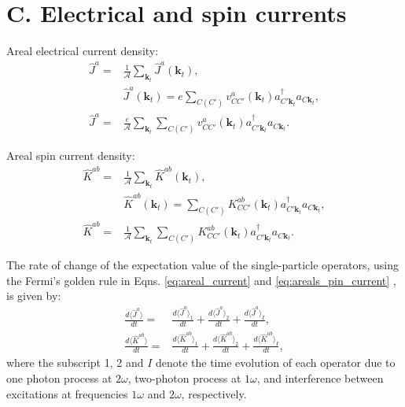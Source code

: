 \documentclass{article}
\begin{document}

\section{C. Electrical and spin currents} %
\label{sec:electrical_and_spin_currents}

Areal electrical current density:
\begin{align}\label{eq:areal_current}
    \hat{J}^{a} = & \frac{1}{\mathcal{A}} \sum_{\mathbf{k}_{t}} \hat{J}^{a}(\mathbf{k}_{t}), \nonumber \\
    & \hat{J}^{a}(\mathbf{k}_{t}) = e \sum_{C(C')}v^{a}_{CC'}(\mathbf{k}_{t})
    a^{\dag}_{C'\mathbf{k}_{t}} a_{C\mathbf{k}_{t}}, \nonumber \\
    \hat{J}^{a} = & \frac{e}{\mathcal{A}} \sum_{\mathbf{k}_{t}} \sum_{C(C')}v^{a}_{CC'}(\mathbf{k}_{t})
    a^{\dag}_{C'\mathbf{k}_{t}} a_{C\mathbf{k}_{t}}.
\end{align}

Areal spin current density:
\begin{align}\label{eq:areals_pin_current}
    \hat{K}^{ab} = & \frac{1}{\mathcal{A}} \sum_{\mathbf{k}_{t}} \hat{K}^{ab}(\mathbf{k}_{t}), \nonumber \\
    & \hat{K}^{ab}(\mathbf{k}_{t}) =   \sum_{C(C')}K^{ab}_{CC'}(\mathbf{k}_{t})
    a^{\dag}_{C'\mathbf{k}_{t}} a_{C\mathbf{k}_{t}}, \nonumber \\
    \hat{K}^{ab} = & \frac{1}{\mathcal{A}} \sum_{\mathbf{k}_{t}} \sum_{C(C')}K^{ab}_{CC'}(\mathbf{k}_{t})
    a^{\dag}_{C'\mathbf{k}_{t}} a_{C\mathbf{k}_{t}}.
\end{align}

\newpage

The rate of change of the expectation value of the single-particle operators,
using the Fermi's golden rule in Eqns. \eqref{eq:areal_current} and \eqref{eq:areals_pin_current} , is given by:
\begin{align*}
    \frac{d\langle \hat{J}^{a}\rangle}{dt} = & \frac{d\langle \hat{J}^{a}\rangle_{1}}{dt} + 
    \frac{d\langle \hat{J}^{a}\rangle_{2}}{dt} + \frac{d\langle \hat{J}^{a}\rangle_{I}}{dt}, \\
    \frac{d\langle \hat{K}^{ab}\rangle}{dt} = & \frac{d\langle \hat{K}^{ab}\rangle_{1}}{dt} + 
    \frac{d\langle \hat{K}^{ab}\rangle_{2}}{dt} + \frac{d\langle \hat{K}^{ab}\rangle_{I}}{dt},
\end{align*}
where the subscript 1, 2 and $I$ denote the time evolution of each operator due to one photon process at $2\omega$, two-photon process at $1\omega$, and interference between excitations at frequencies $1\omega$ and $2\omega$, respectively.
\end{document}
